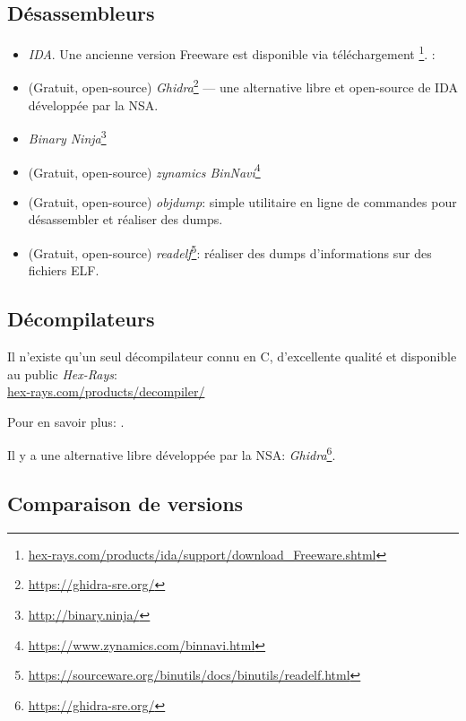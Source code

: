 \subsection{Désassembleurs}


\begin{itemize}
\item \emph{IDA}. Une ancienne version Freeware est disponible via téléchargement
\footnote{\href{http://go.yurichev.com/17031}{hex-rays.com/products/ida/support/download\_Freeware.shtml}}.
\ShortHotKeyCheatsheet: 

\item (Gratuit, open-source) \emph{Ghidra}\footnote{\url{https://ghidra-sre.org/}} --- une alternative
	libre et open-source de IDA développée par la \ac{NSA}.

\item \emph{Binary Ninja}\footnote{\url{http://binary.ninja/}}

\item (Gratuit, open-source) \emph{zynamics BinNavi}\footnote{\url{https://www.zynamics.com/binnavi.html}}

\item (Gratuit, open-source) \emph{objdump}: simple utilitaire en ligne de commandes pour désassembler et réaliser des dumps.

\item (Gratuit, open-source) \emph{readelf}\footnote{\url{https://sourceware.org/binutils/docs/binutils/readelf.html}}:
réaliser des dumps d'informations sur des fichiers ELF.
\end{itemize}

\subsection{Décompilateurs}

Il n'existe qu'un seul décompilateur connu en C, d'excellente qualité et disponible au public \emph{Hex-Rays}:\\
\href{http://go.yurichev.com/17033}{hex-rays.com/products/decompiler/}

Pour en savoir plus: .

Il y a une alternative libre développée par la \ac{NSA}: \emph{Ghidra}\footnote{\url{https://ghidra-sre.org/}}.

\subsection{Comparaison de versions}

